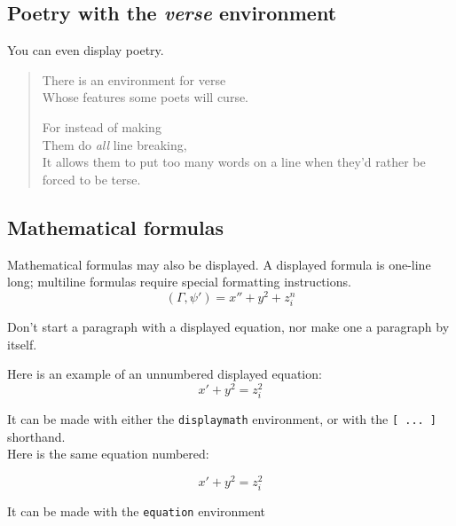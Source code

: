 \documentclass{article}      %
\newcommand{\ip}[2]{(#1, #2)}
\begin{document}
\subsection{Poetry with the \emph{verse} environment}

You can even display poetry.

\begin{verse}
   There is an environment for verse \\    %
   Whose features some poets will curse.


   For instead of making\\
   Them do \emph{all} line breaking, \\
   It allows them to put too many words on a line when they'd rather be forced to be terse.
\end{verse}

\subsection{Mathematical formulas}

Mathematical formulas may also be displayed.  A displayed formula is one-line long; multiline
formulas require special formatting instructions.
   \[  \ip{\Gamma}{\psi'} = x'' + y^{2} + z_{i}^{n}\]

Don't start a paragraph with a displayed equation, nor make one a paragraph by itself.

Here is an example of an unnumbered displayed equation: 
\[ x' + y^{2} = z_{i}^{2} \] 

It can be made with either the {\tt displaymath} environment, or with the {\tt [~...~]} shorthand.\\

Here is the same equation numbered: 

\begin{equation}
x' + y^{2} = z_{i}^{2}
\end{equation}

It can be made with the {\tt equation} environment

\end{document}
